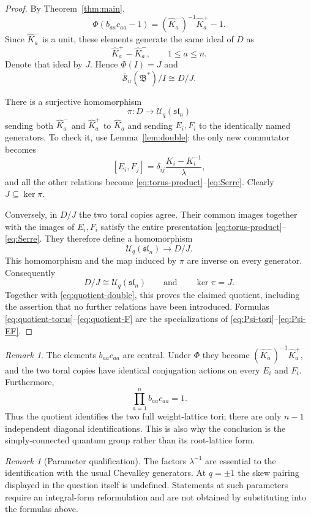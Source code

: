 \documentclass[11pt]{amsart}
\theoremstyle{remark}
\newtheorem{remark}[theorem]{Remark}
\newcommand{\UU}{\mathcal U_q}
\newcommand{\rSk}{\overline{\mathscr S}_n}
\newcommand{\Bstar}{\mathfrak B^{*}}
\newcommand{\slie}{\mathfrak{sl}_n}
\begin{document}
\begin{proof}
By Theorem~\ref{thm:main},
\[
 \Phi(b_{aa}c_{aa}-1)
   =(\widehat K_a^-)^{-1}\widehat K_a^+-1.
\]
Since $\widehat K_a^-$ is a unit, these elements generate the
same ideal of $D$ as
\[
 \widehat K_a^+-\widehat K_a^-,
 \qquad 1\leq a\leq n.
\]
Denote that ideal by $J$.  Hence $\Phi(I)=J$ and
\begin{equation}\label{eq:quotient-double}
 \rSk(\Bstar)/I\cong D/J.
\end{equation}

There is a surjective homomorphism
\[
 \pi:D\longrightarrow\UU(\slie)
\]
sending both $\widehat K_a^-$ and $\widehat K_a^+$ to
$\widehat K_a$ and sending $E_i,F_i$ to the identically named
generators.  To check it, use Lemma~\ref{lem:double}:
the only new commutator becomes
\[
 [E_i,F_j]
   =\delta_{ij}\frac{K_i-K_i^{-1}}{\lambda},
\]
and all the other relations become
\eqref{eq:torus-product}--\eqref{eq:Serre}.
Clearly $J\subseteq\ker\pi$.

Conversely, in $D/J$ the two toral copies agree.  Their common
images together with the images of $E_i,F_i$ satisfy the entire
presentation \eqref{eq:torus-product}--\eqref{eq:Serre}.  They
therefore define a homomorphism
\[
 \UU(\slie)\longrightarrow D/J.
\]
This homomorphism and the map induced by $\pi$ are inverse on
every generator.  Consequently
\[
 D/J\cong\UU(\slie)
 \qquad\text{and}\qquad \ker\pi=J.
\]
Together with \eqref{eq:quotient-double}, this proves the claimed
quotient, including the assertion that no further relations have
been introduced.  Formulas
\eqref{eq:quotient-torus}--\eqref{eq:quotient-F} are the
specializations of \eqref{eq:Psi-tori}--\eqref{eq:Psi-EF}.
\end{proof}

\begin{remark}
The elements $b_{aa}c_{aa}$ are central.  Under $\Phi$ they become
$(\widehat K_a^-)^{-1}\widehat K_a^+$, and the two toral copies
have identical conjugation actions on every $E_i$ and $F_i$.
Furthermore,
\[
 \prod_{a=1}^n b_{aa}c_{aa}=1.
\]
Thus the quotient identifies the two full weight-lattice tori;
there are only $n-1$ independent diagonal identifications.
This is also why the conclusion is the simply-connected quantum
group rather than its root-lattice form.
\end{remark}

\begin{remark}[Parameter qualification]
The factors $\lambda^{-1}$ are essential to the identification
with the usual Chevalley generators.  At $q=\pm1$ the skew pairing
displayed in the question itself is undefined.  Statements at
such parameters require an integral-form reformulation and are
not obtained by substituting into the formulas above.
\end{remark}
\end{document}
